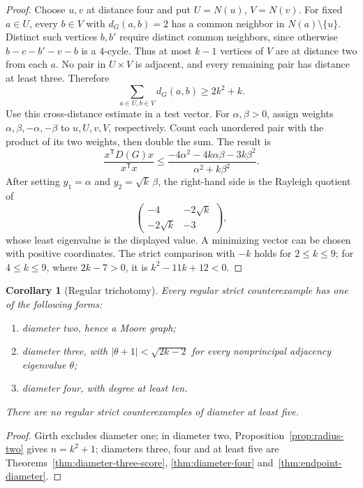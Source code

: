 \documentclass[a4paper,10pt,reqno]{amsart}
\theoremstyle{plain}
\newtheorem{corollary}[theorem]{Corollary}
\theoremstyle{definition}
\theoremstyle{remark}
\begin{document}
\begin{proof}
Choose \(u,v\) at distance four and put \(U=N(u)\), \(V=N(v)\).  For fixed
\(a\in U\), every \(b\in V\) with \(d_G(a,b)=2\) has a common neighbor in
\(N(a)\setminus\{u\}\).  Distinct such vertices \(b,b'\) require distinct
common neighbors, since otherwise \(b-c-b'-v-b\) is a \(4\)-cycle.  Thus at
most \(k-1\) vertices of \(V\) are at distance two from each \(a\).  No pair
in \(U\times V\) is adjacent, and every remaining pair has distance at least
three.  Therefore
\[
 \sum_{a\in U,b\in V}d_G(a,b)\ge2k^2+k.
\]
Use this cross-distance estimate in a test vector.
For \(\alpha,\beta>0\), assign weights \(\alpha,\beta,-\alpha,-\beta\)
to \(u,U,v,V\), respectively. Count each unordered pair with the product
of its two weights, then double the sum.  The result is
\[
 \frac{x^{\mathsf T}D(G)x}{x^{\mathsf T}x}
 \le
 \frac{-4\alpha^2-4k\alpha\beta-3k\beta^2}
 {\alpha^2+k\beta^2}.
\]
After setting \(y_1=\alpha\) and \(y_2=\sqrt{k}\,\beta\), the
right-hand side is the Rayleigh quotient of
\[
 \begin{pmatrix}-4&-2\sqrt{k}\\-2\sqrt{k}&-3\end{pmatrix},
\]
whose least eigenvalue is the displayed value. A minimizing vector can be chosen with
positive coordinates.  The strict comparison with \(-k\) holds for
\(2\le k\le9\); for \(4\le k\le9\), where \(2k-7>0\), it is
\(k^2-11k+12<0\).
\end{proof}

\begin{corollary}[Regular trichotomy]\label{cor:trichotomy}
Every regular strict counterexample has one of the following forms:
\begin{enumerate}
\item diameter two, hence a Moore graph;
\item diameter three, with
\(\lvert\theta+1\rvert<\sqrt{2k-2}\) for every nonprincipal adjacency
eigenvalue \(\theta\);
\item diameter four, with degree at least ten.
\end{enumerate}
There are no regular strict counterexamples of diameter at least five.
\end{corollary}

\begin{proof}
Girth excludes diameter one; in diameter two,
Proposition~\ref{prop:radius-two} gives \(n=k^2+1\); diameters three, four
and at least five are Theorems~\ref{thm:diameter-three-score},
\ref{thm:diameter-four} and~\ref{thm:endpoint-diameter}.
\end{proof}
\end{document}
